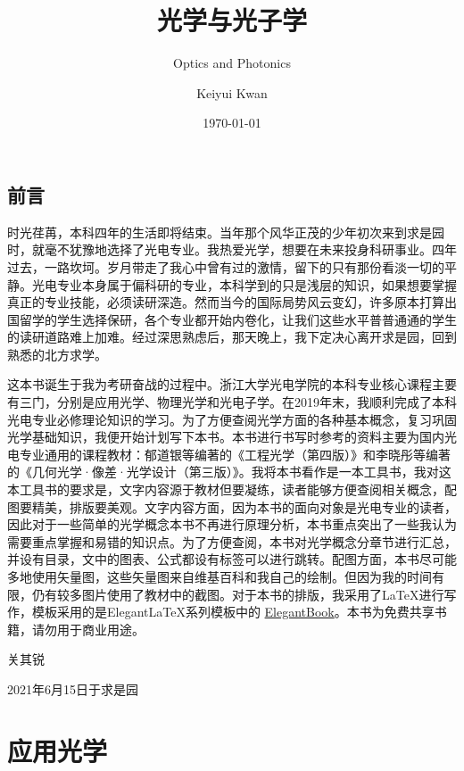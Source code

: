 \documentclass[cn,10pt,chinesefont=founder,math=mtpro2,cite=super,toc=onecol,twoside,openany]{elegantbook}
\title{光学与光子学}
\subtitle{\huge{Optics and Photonics}}
\author{Keiyui Kwan}
\institute{Zhejiang University}
\date{\today}
\begin{document}
	
\maketitle
\frontmatter

\chapter*{前\hspace{1em}言}

时光荏苒，本科四年的生活即将结束。当年那个风华正茂的少年初次来到求是园时，就毫不犹豫地选择了光电专业。我热爱光学，想要在未来投身科研事业。四年过去，一路坎坷。岁月带走了我心中曾有过的激情，留下的只有那份看淡一切的平静。光电专业本身属于偏科研的专业，本科学到的只是浅层的知识，如果想要掌握真正的专业技能，必须读研深造。然而当今的国际局势风云变幻，许多原本打算出国留学的学生选择保研，各个专业都开始内卷化，让我们这些水平普普通通的学生的读研道路难上加难。经过深思熟虑后，那天晚上，我下定决心离开求是园，回到熟悉的北方求学。

这本书诞生于我为考研奋战的过程中。浙江大学光电学院的本科专业核心课程主要有三门，分别是应用光学、物理光学和光电子学。在2019年末，我顺利完成了本科光电专业必修理论知识的学习。为了方便查阅光学方面的各种基本概念，复习巩固光学基础知识，我便开始计划写下本书。本书进行书写时参考的资料主要为国内光电专业通用的课程教材：郁道银等编著的《工程光学（第四版）》和李晓彤等编著的《几何光学·像差·光学设计（第三版）》。我将本书看作是一本工具书，我对这本工具书的要求是，文字内容源于教材但要凝练，读者能够方便查阅相关概念，配图要精美，排版要美观。文字内容方面，因为本书的面向对象是光电专业的读者，因此对于一些简单的光学概念本书不再进行原理分析，本书重点突出了一些我认为需要重点掌握和易错的知识点。为了方便查阅，本书对光学概念分章节进行汇总，并设有目录，文中的图表、公式都设有标签可以进行跳转。配图方面，本书尽可能多地使用矢量图，这些矢量图来自维基百科和我自己的绘制。但因为我的时间有限，仍有较多图片使用了教材中的截图。对于本书的排版，我采用了\LaTeX 进行写作，模板采用的是Elegant\LaTeX 系列模板中的 \href{https://github.com/ElegantLaTeX/ElegantBook}{ElegantBook}。本书为免费共享书籍，请勿用于商业用途。

\begin{flushright}
	关其锐
	\par 2021年6月15日于求是园
\end{flushright}

\tableofcontents

\mainmatter

\part{应用光学}
\end{document}
